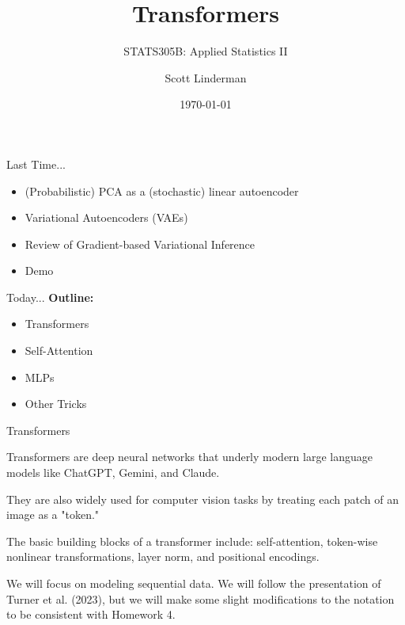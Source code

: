 \documentclass[aspectratio=169]{beamer}
\title{Transformers}
\subtitle{STATS305B: Applied  Statistics II}
\author{Scott Linderman}
\date{\today}
\begin{document}
\maketitle

\begin{frame}{Last Time...}
    \begin{itemize}
        \item (Probabilistic) PCA as a (stochastic) linear autoencoder
        \item Variational Autoencoders (VAEs)
        \item Review of Gradient-based Variational Inference
        \item Demo
    \end{itemize}
    \vspace{1em}
\end{frame}

\begin{frame}{Today...}
    \textbf{Outline:}
    \begin{itemize}
        \item Transformers
        \item Self-Attention
        \item MLPs
        \item Other Tricks
    \end{itemize}
    \vspace{1em}
\end{frame}

    
\begin{frame}[t,allowframebreaks]{Transformers}\label{transformers}
    
Transformers are deep neural networks that underly modern large
language models like ChatGPT, Gemini, and Claude. 

They are also widely used for computer vision tasks by treating each 
patch of an image as a "token."

The basic building blocks of a transformer include: self-attention,
token-wise nonlinear transformations, layer norm, and positional
encodings. 

We will focus on modeling sequential data. We will follow the
presentation of Turner et al. (2023), but we will
make some slight modifications to the notation to be consistent with
Homework 4.
\end{frame}
\end{document}
